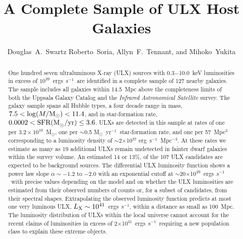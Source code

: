 \documentclass{article}
\newcommand{\msun}{M$_{\odot}$}
\newcommand{\msfr}{M$_{\odot}$~yr$^{-1}$}
\newcommand{\ergl}{ergs~s$^{-1}$}
\begin{document}
\title{A Complete Sample of ULX Host Galaxies}

\author{
Douglas~A.~Swartz
Roberto~Soria, 
Allyn~F.~Tennant, and
Mihoko~Yukita }


\begin{abstract}

One hundred seven ultraluminous X-ray (ULX) sources with 0.3$-$10.0~keV 
luminosities in excess of $10^{39}$~\ergl\ are identified in a complete 
sample of 127 nearby galaxies. The sample includes all galaxies within
14.5~Mpc above the completeness limits of both the Uppsala Galaxy Catalog 
and the {\sl Infrared Astronomical Satellite}\/ survey.
%
The galaxy sample spans all Hubble types, a
four decade range in mass, $7.5<\log(M/{\rm M}_{\odot})<11.4$, and in
star-formation rate, $0.0002<{\rm SFR (M}_{\odot}/{\rm yr)}\le 3.6$.
%
ULXs are detected in this sample at rates of one per $3.2\times10^{10}$~\msun,
 one per $\sim$0.5 \msfr\ star-formation rate, and one per 57~Mpc$^3$
 corresponding to a luminosity density of 
 $\sim$2$\times$10$^{37}$ erg~s$^{-1}$~Mpc$^{-3}$. %
At these rates we estimate as many as 19 additional ULXs remain undetected 
 in fainter dwarf galaxies within the survey volume. 
An estimated 14 or 13\%, of the 107 ULX candidates 
 are expected to be background sources.
%
The differential ULX luminosity function 
 shows a power law slope $\alpha \sim -1.2$ to $-$2.0
 with an exponential cutoff at $\sim$20$\times$10$^{39}$~\ergl\ 
 with precise values depending on the 
 model and on whether the ULX luminosities are estimated from their observed 
 numbers of counts or, for a subset of candidates, from their spectral shapes.
Extrapolating the observed luminosity function predicts at most one very luminous ULX, 
$L_{\rm X} \sim  10^{41}$~\ergl, 
within a distance as small as 100~Mpc.
The luminosity distribution of ULXs within the local universe
 cannot account for the recent claims of luminosities in excess of 
 2$\times$10$^{41}$~\ergl\ 
 requiring a new population class to explain these extreme objects.

\end{abstract}
\end{document}
